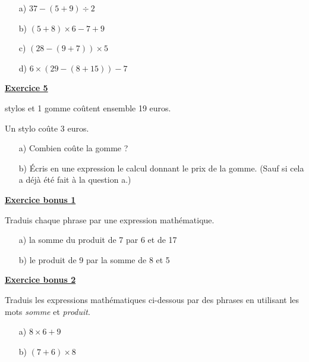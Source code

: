 \documentclass[13pt]{extarticle}
\newcommand{\exo}[1]{%
  \vspace{0.8em}%
  \noindent\large\underline{\textbf{Exercice #1}}%
  \vspace{0.2em}\par%
}
\newcommand{\exobonus}[1]{%
  \vspace{0.8em}%
  \noindent\large\underline{\textbf{Exercice bonus #1}}%
  \vspace{0.2em}\par%
}
\begin{document}
\begin{itemize}
  \item[a)] $37 - (5 + 9) \div 2$
  \item[b)] $(5 + 8) \times 6 - 7 + 9$
  \item[c)] $(28 - (9 + 7)) \times 5$
  \item[d)] $6 \times (29 - (8 + 15)) - 7$
\end{itemize}

\newpage

\exo{5}

 stylos et 1 gomme coûtent ensemble 19 euros.

\noindent Un stylo coûte 3 euros.

\begin{itemize}
  \item[a)] Combien coûte la gomme ?
  \item[b)] Écris en une expression le calcul donnant le prix de la gomme. (Sauf si cela a déjà été fait à la question a.)
\end{itemize}

\exobonus{1}

\noindent Traduis chaque phrase par une expression mathématique.

\begin{itemize}
  \item[a)] la somme du produit de 7 par 6 et de 17
  \item[b)] le produit de 9 par la somme de 8 et 5
\end{itemize}

\exobonus{2}

\noindent Traduis les expressions mathématiques ci-dessous par des phrases en utilisant les mots \emph{somme} et \emph{produit}.

\begin{itemize}
  \item[a)] $8 \times 6 + 9$
  \item[b)] $(7 + 6) \times 8$
\end{itemize}

\newpage
\end{document}
